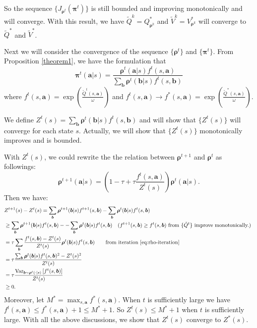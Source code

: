 \documentclass{article}
\begin{document}
    So the sequence $\{J_{{\boldsymbol{\rho}}^{t}}(\boldsymbol{\pi}^{t})\}$ is still bounded and improving monotonically and will converge. With this result, we have $\tilde{Q}^{k} = Q^*_{\bm{\rho}^{k}}$ and $\tilde{V}^{k} = V^*_{\bm{\rho}^{k}}$ will converge to  $\tilde{Q}^{*}$ and $\tilde{V}^{*}$.
    
    Next we will consider the convergence of the sequence $\{\bm{\rho}^t\}$ and $\{\bm{\pi}^t\}$. From Proposition \ref{theorem1}, we have the formulation that  
    \begin{equation}
        \bm{\pi}^t(\bm{a}|s) = \frac{\bm{\rho}^{t}(\bm{a}|s) f^t(s,\bm{a})}{\sum_{\bm{b}}\bm{\rho}^{t}(\bm{b}|s) f^t(s,\bm{b})}
        \label{eq:pi-rho}
    \end{equation} 
    where $f^t(s,\bm{a})=\exp(\frac{\tilde{Q}^t(s,\bm{a})}{\omega})$ and $f^t(s,\bm{a}) \to f^*(s,\bm{a}) = \exp(\frac{\tilde{Q}^*(s,\bm{a})}{\omega})$.
    
    We define $Z^t(s) = \sum_{\bm{b}}\bm{\rho}^{t}(\bm{b}|s) f^t(s,\bm{b})$ and will show that $\{Z^t(s)\}$ will converge for each state $s$. Actually, we will show that $\{Z^t(s)\}$ monotonically improves and is bounded.
    
    With $Z^t(s)$, we could rewrite the the relation between $\bm{\rho}^{t+1}$ and $\bm{\rho}^{t}$ as followings:
    \begin{equation}
        \bm{\rho}^{t+1}(\bm{a}|s) = \left( 1 - \tau + \tau \frac{f^t(s,\bm{a})}{Z^t(s)} \right)\bm{\rho}^{t}(\bm{a}|s).
        \label{eq:rho-iteration}
    \end{equation}
    Then we have:
    \begin{align*}
       & Z^{t+1}(s) - Z^{t}(s)  = \sum_{\bm{b}}\bm{\rho}^{t+1}(\bm{b}|s) f^{t+1}(s,\bm{b}) - \sum_{\bm{b}}\bm{\rho}^{t}(\bm{b}|s) f^{t}(s,\bm{b})\\
       & \ge \sum_{\bm{b}}\bm{\rho}^{t+1}(\bm{b}|s) f^{t}(s,\bm{b}) - - \sum_{\bm{b}}\bm{\rho}^{t}(\bm{b}|s) f^{t}(s,\bm{b}) \quad \text{($f^{t+1}(s,\bm{b}) \ge f^{t}(s,\bm{b})$ from $\{\tilde{Q}^t\}$ improve monotonically.) } \\
       & = \tau \sum_{\bm{b}} \frac{ f^{t}(s,\bm{b}) - Z^t(s)}{Z^t(s)} \bm{\rho}^{t}(\bm{b}|s) f^{t}(s,\bm{b}) \qquad \text{from iteration \eqref{eq:rho-iteration}} \\
       & = \tau  \frac{ \sum_{\bm{b}} \bm{\rho}^{t}(\bm{b}|s) f^{t}(s,\bm{b})^2 - Z^t(s)^2}{Z^t(s)}  \\
       & = \tau \frac{\operatorname{Var}_{\bm{b} \sim \bm{\rho}^t(\cdot|s) } \left[ f^t(s,\bm{b}) \right] }{Z^t(s)} \\
       & \ge 0.
    \end{align*}
    Moreover, let $M^* = \max_{s,\bm{a}} f^*(s,\bm{a} ) $. When $t$ is sufficiently large we have $f^t(s,\bm{a}) \le f^*(s,\bm{a} ) + 1 \le M^* + 1$. So $Z^t(s) \le M^* + 1$ when $t$ is sufficiently large. With all the above discussions, we show that $Z^t(s)$ converge to $Z^*(s)$. 
    
\end{document}
